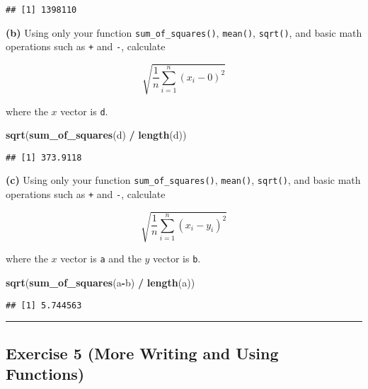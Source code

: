 \documentclass[]{article}
\newenvironment{Shaded}{\begin{snugshade}}{\end{snugshade}}
\newcommand{\KeywordTok}[1]{\textcolor[rgb]{0.13,0.29,0.53}{\textbf{#1}}}
\newcommand{\NormalTok}[1]{#1}
\newcommand{\OperatorTok}[1]{\textcolor[rgb]{0.81,0.36,0.00}{\textbf{#1}}}
\newcommand{\StringTok}[1]{\textcolor[rgb]{0.31,0.60,0.02}{#1}}
\begin{document}
\begin{verbatim}
## [1] 1398110
\end{verbatim}

\textbf{(b)} Using only your function \texttt{sum\_of\_squares()},
\texttt{mean()}, \texttt{sqrt()}, and basic math operations such as
\texttt{+} and \texttt{-}, calculate

\[
\sqrt{\frac{1}{n}\sum_{i = 1}^n (x_i - 0)^{2}}
\]

where the \(x\) vector is \texttt{d}.

\begin{Shaded}
\begin{Highlighting}[]
\KeywordTok{sqrt}\NormalTok{(}\KeywordTok{sum_of_squares}\NormalTok{(d) }\OperatorTok{/}\StringTok{ }\KeywordTok{length}\NormalTok{(d))}
\end{Highlighting}
\end{Shaded}

\begin{verbatim}
## [1] 373.9118
\end{verbatim}

\textbf{(c)} Using only your function \texttt{sum\_of\_squares()},
\texttt{mean()}, \texttt{sqrt()}, and basic math operations such as
\texttt{+} and \texttt{-}, calculate

\[
\sqrt{\frac{1}{n}\sum_{i = 1}^n (x_i - y_i)^{2}}
\]

where the \(x\) vector is \texttt{a} and the \(y\) vector is \texttt{b}.

\begin{Shaded}
\begin{Highlighting}[]
\KeywordTok{sqrt}\NormalTok{(}\KeywordTok{sum_of_squares}\NormalTok{(a}\OperatorTok{-}\NormalTok{b) }\OperatorTok{/}\StringTok{ }\KeywordTok{length}\NormalTok{(a))}
\end{Highlighting}
\end{Shaded}

\begin{verbatim}
## [1] 5.744563
\end{verbatim}

\begin{center}\rule{0.5\linewidth}{0.5pt}\end{center}

\hypertarget{exercise-5-more-writing-and-using-functions}{%
\subsection{Exercise 5 (More Writing and Using
Functions)}\label{exercise-5-more-writing-and-using-functions}}
\end{document}

